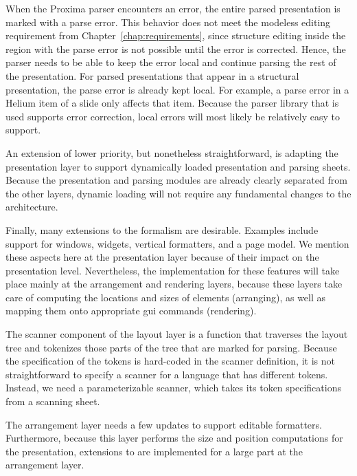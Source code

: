 When the Proxima parser encounters an error, the entire parsed presentation is marked with a parse error. This behavior does not meet the modeless editing requirement from Chapter~\ref{chap:requirements}, since structure editing inside the region with the parse error is not possible until the error is corrected. Hence, the parser needs to be able to keep the error local and continue parsing the rest of the presentation. For parsed presentations that appear in a structural presentation, the parse error is already kept local. For example, a parse error in a Helium item of a slide only affects that item. Because the parser library that is used supports error correction, local errors will most likely be relatively easy to support. 


An extension of lower priority, but nonetheless straightforward, is adapting the presentation layer to support dynamically loaded presentation and parsing sheets. Because the presentation and parsing modules are already clearly separated from the other layers, dynamic loading will not require any fundamental changes to the architecture.

Finally, many extensions to the  formalism are desirable. Examples include support for windows, widgets, vertical formatters, and a page model. We mention these aspects here at the presentation layer because of their impact on the presentation level. Nevertheless, the implementation for these features will take place mainly at the arrangement and rendering layers, because these layers take care of computing the locations and sizes of {\Xprez} elements (arranging), as well as mapping them onto appropriate gui commands (rendering).


The scanner component of the layout layer is a function that traverses the layout tree and tokenizes those parts of the tree that are marked for parsing. Because the specification of the tokens is hard-coded in the scanner definition, it is not straightforward to specify a scanner for a language that has different tokens. Instead, we need a parameterizable scanner, which takes its token specifications from a scanning sheet.


The arrangement layer needs a few updates to support editable formatters. Furthermore, because this layer performs the size and position computations for the presentation, extensions to {\Xprez} are implemented for a large part at the arrangement layer.


